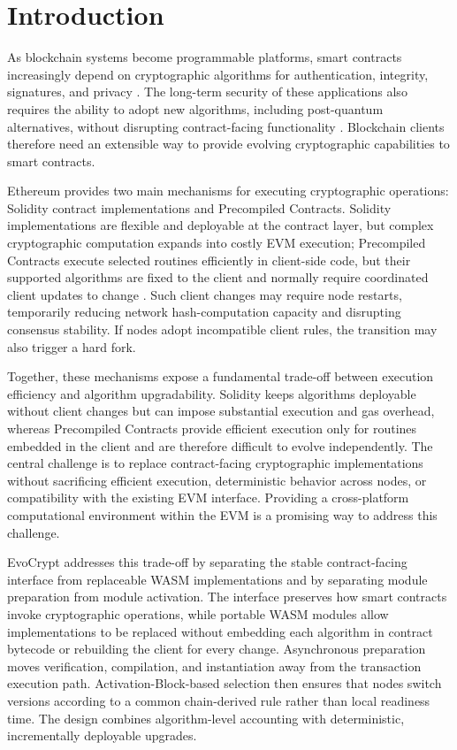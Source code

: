 \documentclass[runningheads]{llncs}
\begin{document}
\section{Introduction}\label{sec1}

As blockchain systems become programmable platforms, smart contracts increasingly depend on cryptographic algorithms for authentication, integrity, signatures, and privacy \cite{nakamoto2008bitcoin,zou2021smartContracts,woodEthereumYellowPaper,ethereumEVM}. The long-term security of these applications also requires the ability to adopt new algorithms, including post-quantum alternatives, without disrupting contract-facing functionality \cite{shor1999,grover1996,nistPqcProject}. Blockchain clients therefore need an extensible way to provide evolving cryptographic capabilities to smart contracts.

Ethereum provides two main mechanisms for executing cryptographic operations: Solidity contract implementations and Precompiled Contracts. Solidity implementations are flexible and deployable at the contract layer, but complex cryptographic computation expands into costly EVM execution; Precompiled Contracts execute selected routines efficiently in client-side code, but their supported algorithms are fixed to the client and normally require coordinated client updates to change \cite{woodEthereumYellowPaper,ethereumEVM,evmCodesPrecompiled}. Such client changes may require node restarts, temporarily reducing network hash-computation capacity and disrupting consensus stability. If nodes adopt incompatible client rules, the transition may also trigger a hard fork.

Together, these mechanisms expose a fundamental trade-off between execution efficiency and algorithm upgradability. Solidity keeps algorithms deployable without client changes but can impose substantial execution and gas overhead, whereas Precompiled Contracts provide efficient execution only for routines embedded in the client and are therefore difficult to evolve independently. The central challenge is to replace contract-facing cryptographic implementations without sacrificing efficient execution, deterministic behavior across nodes, or compatibility with the existing EVM interface. Providing a cross-platform computational environment within the EVM is a promising way to address this challenge.

EvoCrypt addresses this trade-off by separating the stable contract-facing interface from replaceable WASM implementations and by separating module preparation from module activation. The interface preserves how smart contracts invoke cryptographic operations, while portable WASM modules allow implementations to be replaced without embedding each algorithm in contract bytecode or rebuilding the client for every change. Asynchronous preparation moves verification, compilation, and instantiation away from the transaction execution path. Activation-Block-based selection then ensures that nodes switch versions according to a common chain-derived rule rather than local readiness time. The design combines algorithm-level accounting with deterministic, incrementally deployable upgrades.
\end{document}
